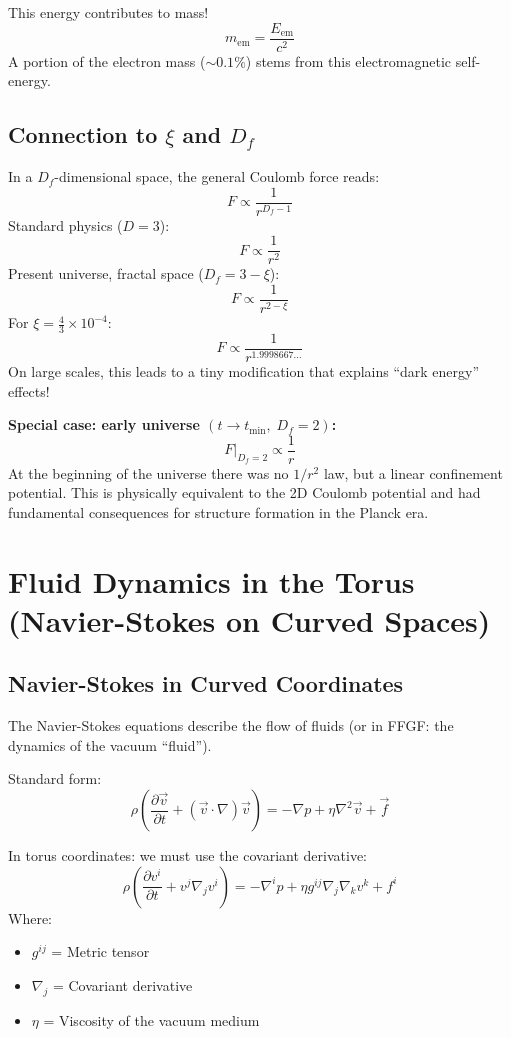 This energy contributes to mass!
\[
m_{\text{em}} = \frac{E_{\text{em}}}{c^2}
\]
A portion of the electron mass (\( \sim 0.1\% \)) stems from this electromagnetic self-energy.

\subsection{Connection to \( \xi \) and \( D_f \)}
In a \(D_f\)-dimensional space, the general Coulomb force reads:
\[
F \propto \frac{1}{r^{D_f - 1}}
\]
Standard physics (\( D = 3 \)):
\[
F \propto \frac{1}{r^2}
\]
Present universe, fractal space (\( D_f = 3 - \xi \)):
\[
F \propto \frac{1}{r^{2 - \xi}}
\]
For \( \xi = \frac{4}{3} \times 10^{-4} \):
\[
F \propto \frac{1}{r^{1.9998667\ldots}}
\]
On large scales, this leads to a tiny modification that explains ``dark energy'' effects!

\textbf{Special case: early universe \((t \to t_{\min},\; D_f = 2)\):}
\[
F\big|_{D_f=2} \propto \frac{1}{r}
\]
At the beginning of the universe there was no \(1/r^2\) law, but a linear confinement potential. This is physically equivalent to the 2D Coulomb potential and had fundamental consequences for structure formation in the Planck era.

\section{Fluid Dynamics in the Torus (Navier-Stokes on Curved Spaces)}
\subsection{Navier-Stokes in Curved Coordinates}
The Navier-Stokes equations describe the flow of fluids (or in FFGF: the dynamics of the vacuum ``fluid'').

Standard form:
\[
\rho\left(\frac{\partial \vec{v}}{\partial t} + (\vec{v} \cdot \nabla) \vec{v}\right) = -\nabla p + \eta \nabla^2 \vec{v} + \vec{f}
\]

In torus coordinates: we must use the covariant derivative:
\[
\rho\left(\frac{\partial v^i}{\partial t} + v^j \nabla_j v^i\right) = -\nabla^i p + \eta g^{ij} \nabla_j \nabla_k v^k + f^i
\]
Where:
\begin{itemize}
	\item \( g^{ij} \) = Metric tensor
	\item \( \nabla_j \) = Covariant derivative
	\item \( \eta \) = Viscosity of the vacuum medium
\end{itemize}

